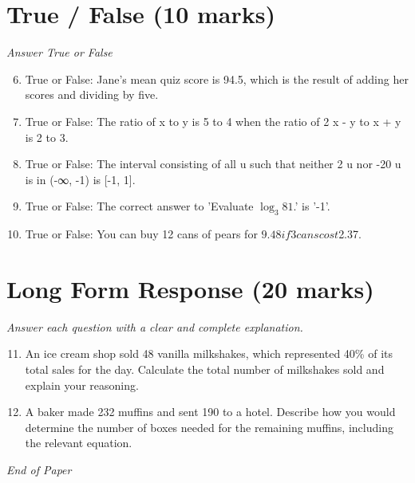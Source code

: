 \documentclass[12pt]{article}
\begin{document}
\section*{True / False (10 marks)}
\textit{Answer True or False}
\begin{enumerate}[label=\arabic*.]
\setcounter{enumi}{5}
\item True or False: Jane's mean quiz score is 94.5, which is the result of adding her scores and dividing by five.
\item True or False: The ratio of x to y is 5 to 4 when the ratio of 2 x - y to x + y is 2 to 3.
\item True or False: The interval consisting of all u such that neither 2 u nor -20 u is in (-∞, -1) is [-1, 1].
\item True or False: The correct answer to 'Evaluate $\log_3 81$.' is '-1'.
\item True or False: You can buy 12 cans of pears for $9.48 if 3 cans cost $2.37.
\end{enumerate}

\section*{Long Form Response (20 marks)}
\textit{Answer each question with a clear and complete explanation.}
\begin{enumerate}[label=\arabic*.]
\setcounter{enumi}{10}
\item An ice cream shop sold 48 vanilla milkshakes, which represented 40\% of its total sales for the day. Calculate the total number of milkshakes sold and explain your reasoning.
\item A baker made 232 muffins and sent 190 to a hotel. Describe how you would determine the number of boxes needed for the remaining muffins, including the relevant equation.
\end{enumerate}

\vfill
\noindent\textit{End of Paper}
\end{document}
